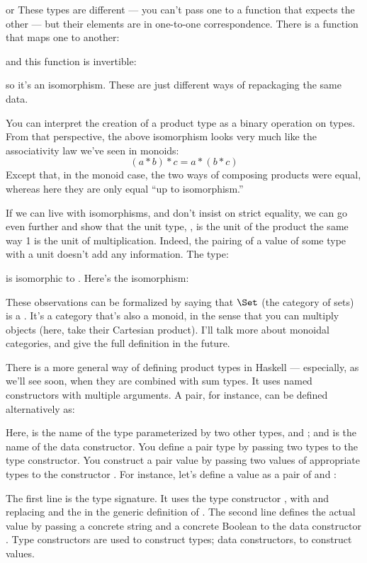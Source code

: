 or
These types are different --- you can't pass one to a function that
expects the other --- but their elements are in one-to-one
correspondence. There is a function that maps one to another:

and this function is invertible:

so it's an isomorphism. These are just different ways of repackaging the
same data.

You can interpret the creation of a product type as a binary operation
on types. From that perspective, the above isomorphism looks very much
like the associativity law we've seen in monoids:
\[(a * b) * c = a * (b * c)\]
Except that, in the monoid case, the two ways of composing products were
equal, whereas here they are only equal ``up to isomorphism.''

If we can live with isomorphisms, and don't insist on strict equality,
we can go even further and show that the unit type, \code{()}, is the
unit of the product the same way 1 is the unit of multiplication.
Indeed, the pairing of a value of some type  with a unit
doesn't add any information. The type:

is isomorphic to . Here's the isomorphism:


These observations can be formalized by saying that $\Set$ (the
category of sets) is a . It's a category that's
also a monoid, in the sense that you can multiply objects (here, take
their Cartesian product). I'll talk more about monoidal categories, and
give the full definition in the future.

There is a more general way of defining product types in Haskell ---
especially, as we'll see soon, when they are combined with sum types. It
uses named constructors with multiple arguments. A pair, for instance,
can be defined alternatively as:

Here,  is the name of the type parameterized by two
other types,  and ; and  is the name of
the data constructor. You define a pair type by passing two types to the
 type constructor. You construct a pair value by passing
two values of appropriate types to the constructor . For
instance, let's define a value  as a pair of
 and :

The first line is the type signature. It uses the type constructor
, with  and  replacing
 and the  in the generic definition of
. The second line defines the actual value by passing a
concrete string and a concrete Boolean to the data constructor
. Type constructors are used to construct types; data
constructors, to construct values.

